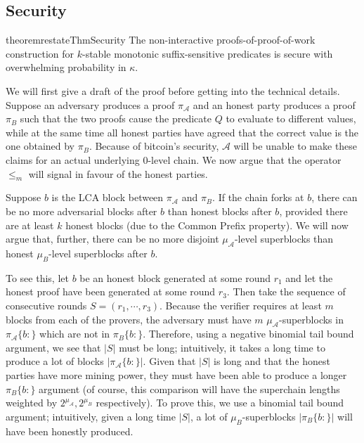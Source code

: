 \subsection{Security}

\begin{restatable}{theorem}{restateThmSecurity}
    \label{thm.security}
    The non-interactive proofs-of-proof-of-work construction for $k$-stable
    monotonic suffix-sensitive predicates is secure with overwhelming
    probability in $\kappa$.
\end{restatable}

We will first give a draft of the proof before getting into the technical
details. Suppose an adversary produces a proof $\pi_\mathcal{A}$ and an honest
party produces a proof $\pi_B$ such that the two proofs cause the predicate $Q$
to evaluate to different values, while at the same time all honest parties have
agreed that the correct value is the one obtained by $\pi_B$. Because of
bitcoin's security, $\mathcal{A}$ will be unable to make these claims for an
actual underlying 0-level chain. We now argue that the operator $\leq_m$ will
signal in favour of the honest parties.

Suppose $b$ is the LCA block between $\pi_\mathcal{A}$ and $\pi_B$. If the chain
forks at $b$, there can be no more adversarial blocks after $b$ than honest
blocks after $b$, provided there are at least $k$ honest blocks (due to the
Common Prefix property). We will now argue that, further, there can be no more
disjoint $\mu_\mathcal{A}$-level superblocks than honest $\mu_B$-level
superblocks after $b$.

To see this, let $b$ be an honest block generated at some round $r_1$ and let
the honest proof have been generated at some round $r_3$. Then take the sequence
of consecutive rounds $S = (r_1, \cdots, r_3)$. Because the verifier requires at
least $m$ blocks from each of the provers, the adversary must have $m$
$\mu_\mathcal{A}$-superblocks in $\pi_\mathcal{A}\{b:\}$ which are not in
$\pi_B\{b:\}$. Therefore, using a negative binomial tail bound argument, we see
that $|S|$ must be long; intuitively, it takes a long time to produce a lot of
blocks $|\pi_\mathcal{A}\{b:\}|$. Given that $|S|$ is long and that the honest
parties have more mining power, they must have been able to produce a longer
$\pi_B\{b:\}$ argument (of course, this comparison will have the superchain
lengths weighted by $2^{\mu_\mathcal{A}}, 2^{\mu_B}$ respectively). To prove
this, we use a binomial tail bound argument; intuitively, given a long time
$|S|$, a lot of $\mu_B$-superblocks $|\pi_B\{b:\}|$ will have been honestly
produced.

